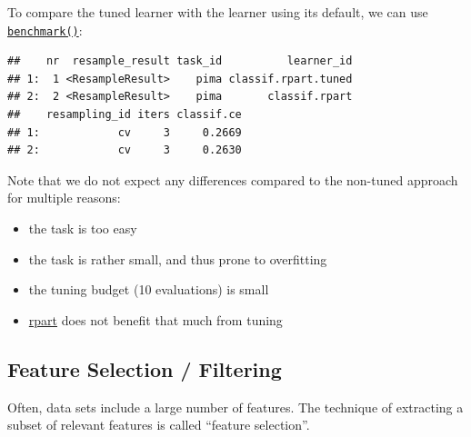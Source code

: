 \documentclass[]{article}
\newenvironment{Shaded}{\begin{snugshade}}{\end{snugshade}}
\newcommand{\DataTypeTok}[1]{\textcolor[rgb]{0.13,0.29,0.53}{#1}}
\newcommand{\DecValTok}[1]{\textcolor[rgb]{0.00,0.00,0.81}{#1}}
\newcommand{\KeywordTok}[1]{\textcolor[rgb]{0.13,0.29,0.53}{\textbf{#1}}}
\newcommand{\NormalTok}[1]{#1}
\newcommand{\OperatorTok}[1]{\textcolor[rgb]{0.81,0.36,0.00}{\textbf{#1}}}
\newcommand{\StringTok}[1]{\textcolor[rgb]{0.31,0.60,0.02}{#1}}
\providecommand{\tightlist}{%
  \setlength{\itemsep}{0pt}\setlength{\parskip}{0pt}}
\renewenvironment{Shaded} {\begin{snugshade}\small} {\end{snugshade}}
\begin{document}
To compare the tuned learner with the learner using its default, we can use \href{https://mlr3.mlr-org.com/reference/benchmark.html}{\texttt{benchmark()}}:

\begin{Shaded}
\end{Shaded}

\begin{verbatim}
##    nr  resample_result task_id          learner_id
## 1:  1 <ResampleResult>    pima classif.rpart.tuned
## 2:  2 <ResampleResult>    pima       classif.rpart
##    resampling_id iters classif.ce
## 1:            cv     3     0.2669
## 2:            cv     3     0.2630
\end{verbatim}

Note that we do not expect any differences compared to the non-tuned approach for multiple reasons:

\begin{itemize}
\tightlist
\item
  the task is too easy
\item
  the task is rather small, and thus prone to overfitting
\item
  the tuning budget (10 evaluations) is small
\item
  \href{https://cran.r-project.org/package=rpart}{rpart} does not benefit that much from tuning
\end{itemize}

\hypertarget{fs}{%
\subsection{Feature Selection / Filtering}\label{fs}}

Often, data sets include a large number of features.
The technique of extracting a subset of relevant features is called ``feature selection''.
\end{document}
